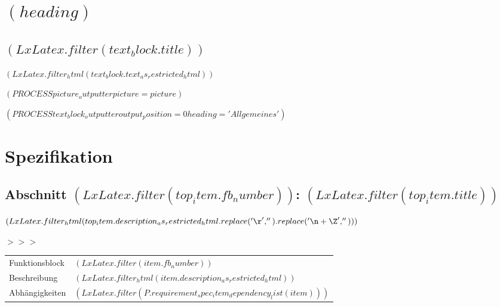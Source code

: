 \documentclass{scrartcl}
\begin{document}

  \newpage

  \section{$( heading )$}


    \subsection{$( LxLatex.filter(text_block.title) )$}

$( LxLatex.filter_html(text_block.text_as_restricted_html) )$

$( PROCESS picture_outputter picture=picture )$


$( PROCESS text_block_outputter output_position=0 heading='Allgemeines' )$

\newpage

\section{Spezifikation}

\setlength{\LTpre}{-0.3cm}



  \subsection{Abschnitt $( LxLatex.filter(top_item.fb_number) )$: $( LxLatex.filter(top_item.title) )$}

    $( LxLatex.filter_html(top_item.description_as_restricted_html.replace('\r', '').replace('\n+\Z', '')) )$

    \vspace{0.5cm}
\parbox[t]{1.0cm}{\textcolor{kivitendodarkred}{$>>>$}}%
\parbox[t]{15.0cm}{%
\begin{longtable}{p{2.8cm}p{11.7cm}}
  Funktionsblock & $( LxLatex.filter(item.fb_number) )$\\
  Beschreibung & $( LxLatex.filter_html(item.description_as_restricted_html) )$\\
  Abhängigkeiten & $( LxLatex.filter(P.requirement_spec_item_dependency_list(item)) )$
\end{longtable}}
\end{document}
